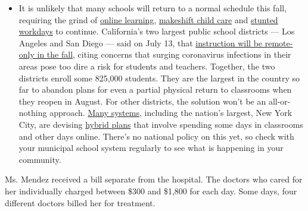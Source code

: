 \begin{itemize}
  \begin{itemize}
  \tightlist
  \item
    It is unlikely that many schools will return to a normal schedule
    this fall, requiring the grind of
    \href{https://www.nytimes.com/2020/06/05/us/coronavirus-education-lost-learning.html?action=click\&pgtype=Article\&state=default\&region=MAIN_CONTENT_3\&context=storylines_faq}{online
    learning},
    \href{https://www.nytimes.com/2020/05/29/us/coronavirus-child-care-centers.html?action=click\&pgtype=Article\&state=default\&region=MAIN_CONTENT_3\&context=storylines_faq}{makeshift
    child care} and
    \href{https://www.nytimes.com/2020/06/03/business/economy/coronavirus-working-women.html?action=click\&pgtype=Article\&state=default\&region=MAIN_CONTENT_3\&context=storylines_faq}{stunted
    workdays} to continue. California's two largest public school
    districts --- Los Angeles and San Diego --- said on July 13, that
    \href{https://www.nytimes.com/2020/07/13/us/lausd-san-diego-school-reopening.html?action=click\&pgtype=Article\&state=default\&region=MAIN_CONTENT_3\&context=storylines_faq}{instruction
    will be remote-only in the fall}, citing concerns that surging
    coronavirus infections in their areas pose too dire a risk for
    students and teachers. Together, the two districts enroll some
    825,000 students. They are the largest in the country so far to
    abandon plans for even a partial physical return to classrooms when
    they reopen in August. For other districts, the solution won't be an
    all-or-nothing approach.
    \href{https://bioethics.jhu.edu/research-and-outreach/projects/eschool-initiative/school-policy-tracker/}{Many
    systems}, including the nation's largest, New York City, are
    devising
    \href{https://www.nytimes.com/2020/06/26/us/coronavirus-schools-reopen-fall.html?action=click\&pgtype=Article\&state=default\&region=MAIN_CONTENT_3\&context=storylines_faq}{hybrid
    plans} that involve spending some days in classrooms and other days
    online. There's no national policy on this yet, so check with your
    municipal school system regularly to see what is happening in your
    community.
  \end{itemize}
\end{itemize}

Ms. Mendez received a bill separate from the hospital. The doctors who
cared for her individually charged between \$300 and \$1,800 for each
day. Some days, four different doctors billed her for treatment.

